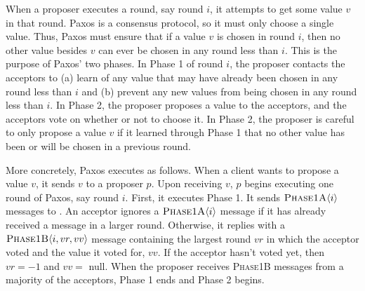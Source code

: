 {}

When a proposer executes a round, say round $i$, it attempts to get some value
%
$v$  in that round.  Paxos is a
consensus protocol, so it must only choose a single value. Thus, Paxos must
ensure that if a value $v$ is chosen in round $i$, then no other value besides
$v$ can ever be chosen in any round less than $i$. This is the purpose of
Paxos' two phases. In Phase 1 of round $i$, the proposer contacts the acceptors
to (a) learn of any value that may have already been chosen in any round less
than $i$ and (b) prevent any new values from being chosen in any round less
than $i$. In Phase 2, the proposer proposes a value to the acceptors, and the
acceptors vote on whether or not to choose it.  In Phase 2, the proposer is
careful to only propose a value $v$ if it learned through Phase 1 that no other
value has been or will be chosen in a previous round.

More concretely, Paxos executes as follows. When a client wants to propose a
value $v$, it sends $v$ to a proposer $p$. Upon receiving $v$, $p$ begins
executing one round of Paxos, say round $i$. First, it executes Phase 1. It
%
sends $\textsc{Phase1A}\langle{i}\rangle$ messages to . An acceptor
ignores a $\textsc{Phase1A}\langle{i}\rangle$ message if it has already received a message in a
larger round.  Otherwise, it replies with a $\textsc{Phase1B}\langle{i, vr, vv}\rangle$ message
containing the largest round $vr$ in which the acceptor voted and the value it
voted for, $vv$. If the acceptor hasn't voted yet, then $vr = -1$ and $vv = $
\textsf{null}. When the proposer receives \textsc{Phase1B} messages from a
majority of the acceptors, Phase 1 ends and Phase 2 begins.

